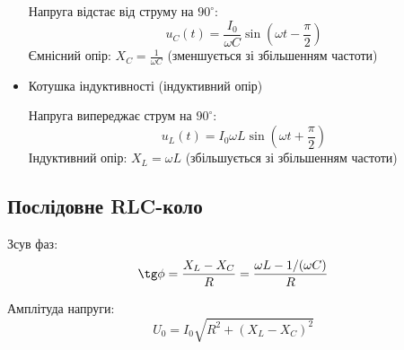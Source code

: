 \begin{Theory}
\begin{itemize}
		      Напруга відстає від струму на $90^\circ$:
		      \begin{equation}
			      u_C(t) = \frac{I_0}{\omega C} \sin\left(\omega t - \frac{\pi}{2}\right)
		      \end{equation}
		      Ємнісний опір: $X_C = \frac{1}{\omega C}$ (зменшується зі збільшенням частоти)

		\item Котушка індуктивності (індуктивний опір)

		      \begin{center}
		      \end{center}

		      Напруга випереджає струм на $90^\circ$:
		      \begin{equation}
			      u_L(t) = I_0 \omega L \sin\left(\omega t + \frac{\pi}{2}\right)
		      \end{equation}
		      Індуктивний опір: $X_L = \omega L$ (збільшується зі збільшенням частоти)

	\end{itemize}

	\subsection*{Послідовне RLC-коло}

	\begin{center}
	\end{center}

	Зсув фаз:
	\begin{equation}
		\tg\phi = \frac{X_L - X_C}{R} = \frac{\omega L - 1/(\omega C)}{R}
	\end{equation}

	Амплітуда напруги:
	\begin{equation}
		U_0 = I_0 \sqrt{R^2 + (X_L - X_C)^2}
	\end{equation}


\end{Theory}
